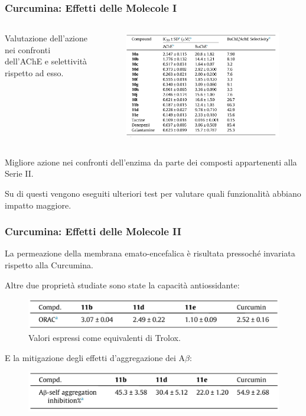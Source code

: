\documentclass[9pt]{beamer}
\begin{document}
\begin{frame}
	\frametitle{Curcumina: Effetti delle Molecole I}
	\begin{columns}
		\begin{column}{.4\textwidth}
			Valutazione dell'azione nei confronti dell'AChE e selettività rispetto ad esso.
		\end{column}
		\begin{column}{.6\textwidth}
			\begin{figure}
				\includegraphics[width=\textwidth]{immagini/tabellacomposti_curcdone.png}
			\end{figure}
		\end{column}
	\end{columns}
	\bigskip
	Migliore azione nei confronti dell'enzima da parte dei composti appartenenti alla Serie II.
	
	Su di questi vengono eseguiti ulteriori test per valutare quali funzionalità abbiano impatto maggiore.
\end{frame}

\begin{frame}
	\frametitle{Curcumina: Effetti delle Molecole II}
	La permeazione della membrana emato-encefalica è risultata pressoché invariata rispetto alla Curcumina.
	
	Altre due proprietà studiate sono state la capacità antiossidante:
	\begin{figure}
		\includegraphics{immagini/roi_curcdone.png}
		{\caption*{\footnotesize{Valori espressi come equivalenti di Trolox.}}}
	\end{figure}
	
	E la mitigazione degli effetti d'aggregazione dei A$\beta$:
	\begin{figure}
		\includegraphics{immagini/selfab_curcdone.png}
	\end{figure}
\end{frame}
\end{document}
